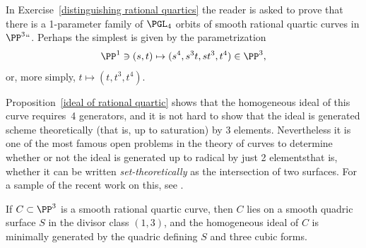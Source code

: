 \begin{example}
In Exercise~\ref{distinguishing rational quartics} the reader
is asked to
prove that there is a 1\hbox{-}parameter family of
$\PGL_4$ orbits of smooth rational quartic curves in $\PP^3` `$.
Perhaps the simplest is given by the parametrization
$$
\PP^1 \ni (s,t) \mapsto (s^4, s^3t, st^3, t^4)\in \PP^3,
$$
or, more simply, $t\mapsto(t, t^3, t^4)$.

Proposition~\ref{ideal of rational quartic} shows that the homogeneous
ideal of this curve requires~4 generators, and it is not hard to show
that the ideal is generated scheme theoretically (that is, up to saturation) by 3 elements. Nevertheless it is
one of the most famous open problems in the theory of curves to determine whether or not the ideal
is generated up to radical by just 2 elements\emdash that is, whether it
can be written
\emph{set-theoretically}
%
as the intersection of two surfaces. For a sample of the recent
work on this, see \cite{MR3356940}.
\end{example}

\begin{proposition}\label{ideal of rational quartic}
If $C\subset \PP^3$ is a smooth rational quartic curve, then $C$ lies on a smooth quadric
surface $S$ in the divisor class $(1,3)$, and the homogeneous ideal of $C$ is minimally
generated by the quadric defining $S$ and three cubic forms.
\end{proposition}

